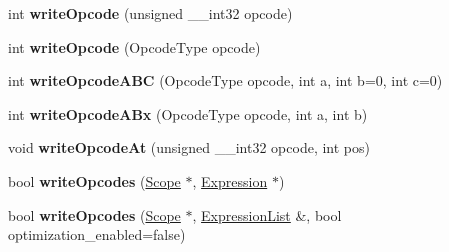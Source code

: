 \begin{DoxyCompactItemize}
\item 
int {\bfseries write\+Opcode} (unsigned \+\_\+\+\_\+int32 opcode)\hypertarget{class_object_script_1_1_o_s_1_1_core_1_1_compiler_a033eb38d76a50b811898699acd212e73}{}\label{class_object_script_1_1_o_s_1_1_core_1_1_compiler_a033eb38d76a50b811898699acd212e73}

\item 
int {\bfseries write\+Opcode} (Opcode\+Type opcode)\hypertarget{class_object_script_1_1_o_s_1_1_core_1_1_compiler_a9822fd7b253ef29ca3544f94754de778}{}\label{class_object_script_1_1_o_s_1_1_core_1_1_compiler_a9822fd7b253ef29ca3544f94754de778}

\item 
int {\bfseries write\+Opcode\+A\+BC} (Opcode\+Type opcode, int a, int b=0, int c=0)\hypertarget{class_object_script_1_1_o_s_1_1_core_1_1_compiler_ac27090ec6bb504d4b0124212fcc9b41a}{}\label{class_object_script_1_1_o_s_1_1_core_1_1_compiler_ac27090ec6bb504d4b0124212fcc9b41a}

\item 
int {\bfseries write\+Opcode\+A\+Bx} (Opcode\+Type opcode, int a, int b)\hypertarget{class_object_script_1_1_o_s_1_1_core_1_1_compiler_a9b422a8064828bda165dbfc4aabd73f8}{}\label{class_object_script_1_1_o_s_1_1_core_1_1_compiler_a9b422a8064828bda165dbfc4aabd73f8}

\item 
void {\bfseries write\+Opcode\+At} (unsigned \+\_\+\+\_\+int32 opcode, int pos)\hypertarget{class_object_script_1_1_o_s_1_1_core_1_1_compiler_a9a95a274dc5574b013b0d6e32cfe0bf8}{}\label{class_object_script_1_1_o_s_1_1_core_1_1_compiler_a9a95a274dc5574b013b0d6e32cfe0bf8}

\item 
bool {\bfseries write\+Opcodes} (\hyperlink{struct_object_script_1_1_o_s_1_1_core_1_1_compiler_1_1_scope}{Scope} $\ast$, \hyperlink{struct_object_script_1_1_o_s_1_1_core_1_1_compiler_1_1_expression}{Expression} $\ast$)\hypertarget{class_object_script_1_1_o_s_1_1_core_1_1_compiler_a30264c21bfc86957691863a4edd3ce36}{}\label{class_object_script_1_1_o_s_1_1_core_1_1_compiler_a30264c21bfc86957691863a4edd3ce36}

\item 
bool {\bfseries write\+Opcodes} (\hyperlink{struct_object_script_1_1_o_s_1_1_core_1_1_compiler_1_1_scope}{Scope} $\ast$, \hyperlink{struct_object_script_1_1_o_s_1_1_core_1_1_compiler_1_1_expression_list}{Expression\+List} \&, bool optimization\+\_\+enabled=false)\hypertarget{class_object_script_1_1_o_s_1_1_core_1_1_compiler_a2893c25957a3699951b41ffcc6879c97}{}\label{class_object_script_1_1_o_s_1_1_core_1_1_compiler_a2893c25957a3699951b41ffcc6879c97}


\end{DoxyCompactItemize}
